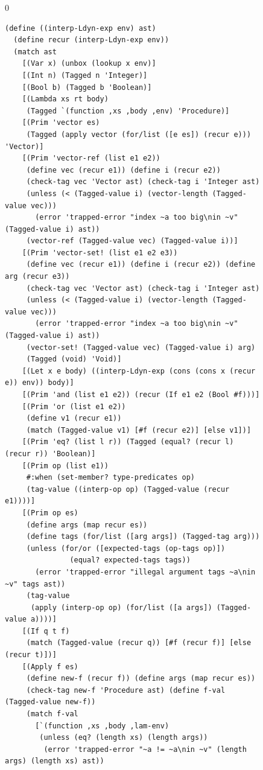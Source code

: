 \documentclass[7x10]{TimesAPriori_MIT}%
\def\racketEd{0}
\providecommand{\BookEdition}{1}
\let\edition\BookEdition
\numberwithin{theorem}{chapter}
\numberwithin{definition}{chapter}
\numberwithin{equation}{chapter}
\begin{document}
\begin{figure}[tbp]
  \begin{tcolorbox}[colback=white]
    {\if\edition\racketEd
\begin{lstlisting}[basicstyle=\ttfamily\footnotesize]
(define ((interp-Ldyn-exp env) ast)
  (define recur (interp-Ldyn-exp env))
  (match ast
    [(Var x) (unbox (lookup x env)]
    [(Int n) (Tagged n 'Integer)]
    [(Bool b) (Tagged b 'Boolean)]
    [(Lambda xs rt body)
     (Tagged `(function ,xs ,body ,env) 'Procedure)]
    [(Prim 'vector es)
     (Tagged (apply vector (for/list ([e es]) (recur e))) 'Vector)]
    [(Prim 'vector-ref (list e1 e2))
     (define vec (recur e1)) (define i (recur e2))
     (check-tag vec 'Vector ast) (check-tag i 'Integer ast)
     (unless (< (Tagged-value i) (vector-length (Tagged-value vec)))
       (error 'trapped-error "index ~a too big\nin ~v" (Tagged-value i) ast))
     (vector-ref (Tagged-value vec) (Tagged-value i))]
    [(Prim 'vector-set! (list e1 e2 e3))
     (define vec (recur e1)) (define i (recur e2)) (define arg (recur e3))
     (check-tag vec 'Vector ast) (check-tag i 'Integer ast)
     (unless (< (Tagged-value i) (vector-length (Tagged-value vec)))
       (error 'trapped-error "index ~a too big\nin ~v" (Tagged-value i) ast))
     (vector-set! (Tagged-value vec) (Tagged-value i) arg)
     (Tagged (void) 'Void)]
    [(Let x e body) ((interp-Ldyn-exp (cons (cons x (recur e)) env)) body)]
    [(Prim 'and (list e1 e2)) (recur (If e1 e2 (Bool #f)))]
    [(Prim 'or (list e1 e2))
     (define v1 (recur e1))
     (match (Tagged-value v1) [#f (recur e2)] [else v1])]
    [(Prim 'eq? (list l r)) (Tagged (equal? (recur l) (recur r)) 'Boolean)]
    [(Prim op (list e1))
     #:when (set-member? type-predicates op)
     (tag-value ((interp-op op) (Tagged-value (recur e1))))]
    [(Prim op es)
     (define args (map recur es))
     (define tags (for/list ([arg args]) (Tagged-tag arg)))
     (unless (for/or ([expected-tags (op-tags op)])
               (equal? expected-tags tags))
       (error 'trapped-error "illegal argument tags ~a\nin ~v" tags ast))
     (tag-value
      (apply (interp-op op) (for/list ([a args]) (Tagged-value a))))]
    [(If q t f)
     (match (Tagged-value (recur q)) [#f (recur f)] [else (recur t)])]
    [(Apply f es)
     (define new-f (recur f)) (define args (map recur es))
     (check-tag new-f 'Procedure ast) (define f-val (Tagged-value new-f))
     (match f-val 
       [`(function ,xs ,body ,lam-env)
        (unless (eq? (length xs) (length args))
         (error 'trapped-error "~a != ~a\nin ~v" (length args) (length xs) ast))

\end{lstlisting}}
\end{tcolorbox}
\end{figure}
\end{document}
